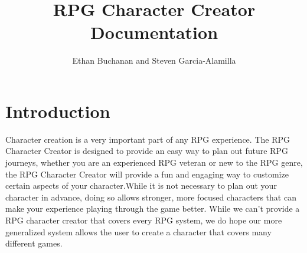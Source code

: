 \documentclass[10pt,conference,onecolumn,compsoc]{IEEEtran}
\begin{document}
\title{RPG Character Creator Documentation}
%
%


\author{Ethan Buchanan and Steven Garcia-Alamilla \\%
}



\maketitle



\IEEEdisplaynontitleabstractindextext

\IEEEpeerreviewmaketitle



\section{Introduction}



Character creation is a very important part of any RPG experience. The RPG Character Creator is designed to provide an easy way to plan out future RPG journeys, whether you are an experienced RPG veteran or new to the RPG genre, the RPG Character Creator will provide a fun and engaging way to customize certain aspects of your character.While it is not necessary to plan out your character in advance, doing so allows stronger, more focused characters that can make your experience playing through the game better. While we can't provide a RPG character creator that covers every RPG system, we do hope our more generalized system allows the user to create a character that covers many different games.
\end{document}
